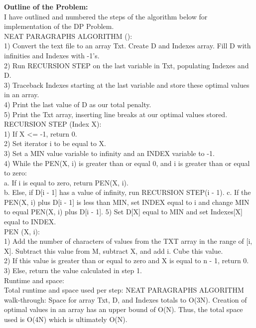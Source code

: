 \documentclass[11pt, solution, letterpaper]{format}
\begin{document}
\textbf{Outline of the Problem:}\\
I have outlined and numbered the steps of the algorithm below for implementation of the DP Problem. \\

NEAT PARAGRAPHS ALGORITHM ():\\
1) Convert the text file to an array Txt. Create D and Indexes array. Fill D with infinities and Indexes with -1's. \\
2) Run RECURSION STEP on the last variable in Txt, populating Indexes and D.\\
3) Traceback Indexes starting at the last variable and store these optimal values in an array.\\
4) Print the last value of D as our total penalty.\\
5) Print the Txt array, inserting line breaks at our optimal values stored.\\

RECURSION STEP (Index X):\\
1) If X <= -1, return 0.\\
2) Set iterator i to be equal to X.\\
3) Set a MIN value variable to infinity and an INDEX variable to -1.\\
4) While the PEN(X, i) is greater than or equal 0, and i is greater than or equal to zero:\\
a. If i is equal to zero, return PEN(X, i).\\
b. Else, if D[i - 1] has a value of infinity, run RECURSION STEP(i - 1).
c. If the PEN(X, i) plus D[i - 1] is less than MIN, set INDEX equal to i and change MIN to equal PEN(X, i) plus D[i - 1]. 
5) Set D[X] equal to MIN and set Indexes[X] equal to INDEX.\\

PEN (X, i):\\
1) Add the number of characters of values from the TXT array in the range of [i, X]. Subtract this value from M, subtract X, and add i. Cube this value. \\
2) If this value is greater than or equal to zero and X is equal to n - 1, return 0.\\
3) Else, return the value calculated in step 1.\\

Runtime and space:\\
Total runtime and space used per step:
NEAT PARAGRAPHS ALGORITHM walk-through:
Space for array Txt, D, and Indexes totals to O(3N). Creation of optimal values in an array has an upper bound of O(N). Thus, the total space used is O(4N) which is ultimately O(N).\\
\end{document}
